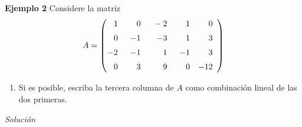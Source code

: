 \begin{frame}%
	
	\begin{ej}{\textbf{Ejemplo 2}}
		Considere la matriz
		\[
		A = 
		\left( 
		\begin{array}{@{\hspace{0.1\tabcolsep}}rrrrr}	
		1 & \phantom{-1}0 & \phantom{1}-2 & \phantom{-1}1 & 0 \\[2mm] 
		0 & -1 & -3 & 1 & 3 \\[2mm] 
		-2 & -1 & 1 & -1 & 3 \\[2mm] 
		0 & 3 & 9 & 0 & -12 
		\end{array} 
		\right)
		\]
		
		\vspace{-1mm}	
		\begin{enumerate}
			\item[\labelname{$c$}] Si es posible, escriba la tercera columna de $A$ como combinación lineal de las dos primeras.
		\end{enumerate}
	\end{ej}
	\textit{Solución}
	
\end{frame}


\subsection{}

